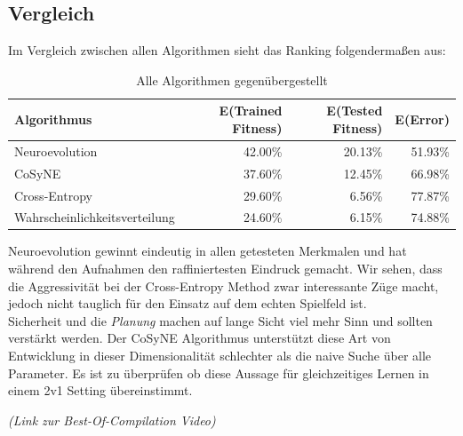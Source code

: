         \subsection{Vergleich} \label{algo-comparisson}

             Im Vergleich zwischen allen Algorithmen sieht das Ranking folgendermaßen aus:

                \begin{table}[H]
                    \begin{center}
                    \begin{tabular}{ |l|r|r|r| } 
                        \hline
                        \textbf{Algorithmus}          & E(Trained Fitness) & E(Tested Fitness) & E(Error)    \\ \hline
                        Neuroevolution                &          42.00\%   &         20.13\%   &    51.93\%  \\ \hline
                        CoSyNE                        &          37.60\%   &         12.45\%   &    66.98\%  \\ \hline
                        Cross-Entropy                 &          29.60\%   &          6.56\%   &    77.87\%  \\ \hline
                        Wahrscheinlichkeitsverteilung &          24.60\%   &          6.15\%   &    74.88\%  \\ \hline
                    \end{tabular}
                    \end{center}
                    \caption{Alle Algorithmen gegenübergestellt \label{fig:vergleichstabelle}}
                \end{table}

            \noindent
            Neuroevolution gewinnt eindeutig in allen getesteten Merkmalen und hat während den Aufnahmen den raffiniertesten Eindruck gemacht. Wir sehen, dass die Aggressivität bei der Cross-Entropy Method zwar interessante Züge macht, jedoch nicht tauglich für den Einsatz auf dem echten Spielfeld ist. \\[2mm]

            \noindent
            Sicherheit und die \textit{Planung} machen auf lange Sicht viel mehr Sinn und sollten verstärkt werden. Der CoSyNE Algorithmus unterstützt diese Art von Entwicklung in dieser Dimensionalität schlechter als die naive Suche über alle Parameter. Es ist zu überprüfen ob diese Aussage für gleichzeitiges Lernen in einem 2v1 Setting übereinstimmt.\\[2mm]

            \begin{center} \textit{(Link zur Best-Of-Compilation Video)} \end{center}